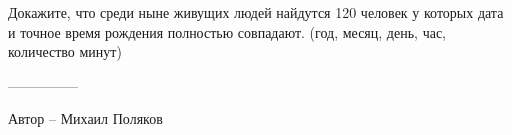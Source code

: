 \question
Докажите, что среди ныне живущих людей найдутся 120 человек у которых дата и точное время рождения полностью совпадают. (год, месяц, день, час, количество минут)

---------------

Автор -- Михаил Поляков
